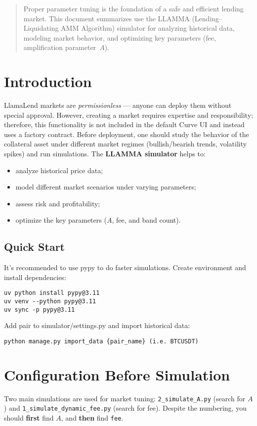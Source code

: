 \documentclass[notitlepage]{revtex4-2}
\begin{document}
\begin{abstract}
Proper parameter tuning is the foundation of a safe and efficient lending market. This document summarizes use the
LLAMMA (Lending--Liquidating AMM Algorithm) simulator for analyzing historical data, modeling market behavior, and
optimizing key parameters (fee, amplification parameter~$A$).
\end{abstract}

\section{Introduction}
LlamaLend markets are \emph{permissionless} --- anyone can deploy them without special approval. However, creating
a market requires expertise and responsibility; therefore, this functionality is not included in the default Curve UI
and instead uses a factory contract.
Before deployment, one should study the behavior of the collateral asset under different market regimes
(bullish/bearish trends, volatility spikes) and run simulations. The \textbf{LLAMMA simulator} helps to:
\begin{itemize}
  \item analyze historical price data;
  \item model different market scenarios under varying parameters;
  \item assess risk and profitability;
  \item optimize the key parameters ($A$, fee, and band count).
\end{itemize}

\subsection*{Quick Start}
It's recommended to use pypy to do faster simulations. Create environment and install dependencies:

\begin{verbatim}
uv python install pypy@3.11
uv venv --python pypy@3.11
uv sync -p pypy@3.11
\end{verbatim}

Add pair to simulator/settings.py and import historical data:
\begin{verbatim}
python manage.py import_data {pair_name} (i.e. BTCUSDT)
\end{verbatim}

\section{Configuration Before Simulation}
Two main simulations are used for market tuning: \texttt{2\_simulate\_A.py} (search for $A$) and
\texttt{1\_simulate\_dynamic\_fee.py} (search for fee). Despite the numbering, you should \textbf{first} find $A$,
and \textbf{then} find \texttt{fee}.
\end{document}
